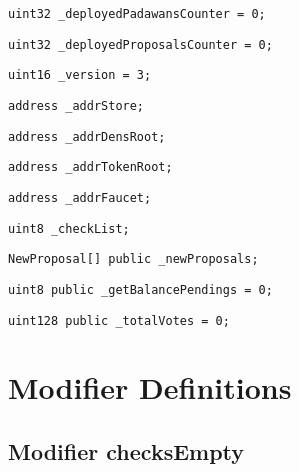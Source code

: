 \begin{lstlisting}[firstnumber=35]
    uint32 _deployedPadawansCounter = 0;
\end{lstlisting}

\begin{lstlisting}[firstnumber=36]
    uint32 _deployedProposalsCounter = 0;
\end{lstlisting}

\begin{lstlisting}[firstnumber=37]
    uint16 _version = 3;
\end{lstlisting}

\begin{lstlisting}[firstnumber=39]
    address _addrStore;
\end{lstlisting}

\begin{lstlisting}[firstnumber=40]
    address _addrDensRoot;
\end{lstlisting}

\begin{lstlisting}[firstnumber=41]
    address _addrTokenRoot;
\end{lstlisting}

\begin{lstlisting}[firstnumber=42]
    address _addrFaucet;
\end{lstlisting}

\begin{lstlisting}[firstnumber=44]
    uint8 _checkList;
\end{lstlisting}

\begin{lstlisting}[firstnumber=46]
    NewProposal[] public _newProposals;
\end{lstlisting}

\begin{lstlisting}[firstnumber=47]
    uint8 public _getBalancePendings = 0;
\end{lstlisting}

\begin{lstlisting}[firstnumber=48]
    uint128 public _totalVotes = 0;
\end{lstlisting}

\section{Modifier Definitions}


\subsection{Modifier checksEmpty}


